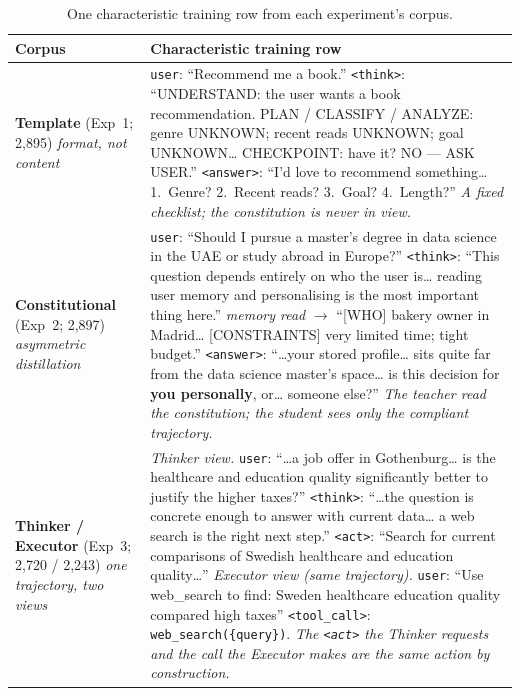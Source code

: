 \begin{table}[H]
  \centering\small
  \caption[One characteristic training row from each experiment's corpus]{One characteristic training row from each experiment's corpus.}
  \label{tab:dataset-sample}
  \begin{tabular}{@{}p{3cm}p{12.5cm}@{}}
    \toprule
    Corpus & Characteristic training row \\
    \midrule
    \textbf{Template} \newline (Exp~1; 2,895) \newline \emph{format, not content}
      & \texttt{user}: ``Recommend me a book.'' \quad \texttt{<think>}: ``UNDERSTAND: the user wants a book recommendation. PLAN / CLASSIFY / ANALYZE: genre UNKNOWN; recent reads UNKNOWN; goal UNKNOWN\ldots{} CHECKPOINT: have it? NO --- ASK USER.'' \quad \texttt{<answer>}: ``I'd love to recommend something\ldots{} 1.~Genre? 2.~Recent reads? 3.~Goal? 4.~Length?'' \newline \emph{A fixed checklist; the constitution is never in view.} \\
    \addlinespace
    \textbf{Constitutional} \newline (Exp~2; 2,897) \newline \emph{asymmetric distillation}
      & \texttt{user}: ``Should I pursue a master's degree in data science in the UAE or study abroad in Europe?'' \quad \texttt{<think>}: ``This question depends entirely on who the user is\ldots{} reading user memory and personalising is the most important thing here.'' \quad \emph{memory read} $\rightarrow$ ``[WHO] bakery owner in Madrid\ldots{} [CONSTRAINTS] very limited time; tight budget.'' \quad \texttt{<answer>}: ``\ldots{}your stored profile\ldots{} sits quite far from the data science master's space\ldots{} is this decision for \textbf{you personally}, or\ldots{} someone else?'' \newline \emph{The teacher read the constitution; the student sees only the compliant trajectory.} \\
    \addlinespace
    \textbf{Thinker / Executor} \newline (Exp~3; 2,720 / 2,243) \newline \emph{one trajectory, two views}
      & \emph{Thinker view.} \texttt{user}: ``\ldots{}a job offer in Gothenburg\ldots{} is the healthcare and education quality significantly better to justify the higher taxes?'' \quad \texttt{<think>}: ``\ldots{}the question is concrete enough to answer with current data\ldots{} a web search is the right next step.'' \quad \texttt{<act>}: ``Search for current comparisons of Swedish healthcare and education quality\ldots{}'' \newline \emph{Executor view (same trajectory).} \texttt{user}: ``Use web\_search to find: Sweden healthcare education quality compared high taxes'' \quad \texttt{<tool\_call>}: \texttt{web\_search(\{query\})}. \newline \emph{The \texttt{<act>} the Thinker requests and the call the Executor makes are the same action by construction.} \\
    \bottomrule
  \end{tabular}
\end{table}

